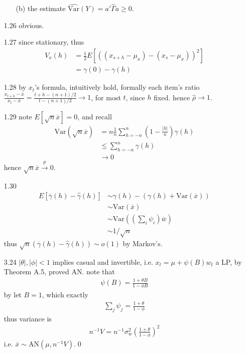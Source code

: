 \documentclass[paper=a4, fontsize=11pt]{scrartcl} %
\numberwithin{equation}{section} %
\numberwithin{figure}{section} %
\numberwithin{table}{section} %
\def \var {\text{Var}}
\begin{document}
\begin{itemize}
\begin{itemize}
		\item[(b)] the estimate $\widehat{\var}(Y)=a'\widehat{\Gamma}a\geq 0$.
	\end{itemize}
	\item[1.26] obvious.
	\item[1.27] since stationary, thus
	\begin{align}
		V_x(h) &= \frac{1}{2} E[((x_{s+h}-\mu_x)- (x_s-\mu_x))^2]\\
			&= \gamma(0) - \gamma(h)
	\end{align}
	\item[1.28] by $x_t$'s formula, intuitively hold, formally each item's ratio $\frac{x_{t+h}-\overline{x}}{x_t-\overline{x}}=\frac{t+h-(n+1)/2}{t-(n+1)/2}\rightarrow 1$, for most $t$, since $h$ fixed. hence $\widehat{\rho}\rightarrow 1$.
	\item[1.29] note $E[\sqrt{n}\overline{x}]=0$, and recall
	\begin{align}
		\var(\sqrt{n} \overline{x}) &= n\frac{1}{n}\sum_{h=-n}^n(1-\frac{|h|}{n})\gamma(h)\\
			&\leq \sum_{h=-n}^n\gamma(h)\\
			&\rightarrow 0
	\end{align}
	hence $\sqrt{n}\overline{x}\stackrel{p}{\rightarrow}0$.
	\item[1.30]
	\begin{align}
		E[\overline{\gamma}(h)- \widehat{\gamma}(h)] &\sim \gamma(h)-(\gamma(h)+\var(\overline{x}))\\
			&\sim \var(\overline{x})\\
			&\sim \var((\sum_i \psi_i)\overline{w})\\
			&\sim 1/\sqrt{n}
	\end{align}
	thus $\sqrt{n}(\overline{\gamma}(h)- \widehat{\gamma}(h)) \sim o(1)$ by Markov's.
	\item[3.24] $|\theta|,|\phi|<1$ implies casual and invertible, i.e. $x_t = \mu+ \psi(B)w_t$ a LP, by Theorem A.5, proved AN. note that
	\begin{align}
		\psi(B) = \frac{1 + \theta B}{1- \phi B}
	\end{align}
	by let $B=1$, which exactly
	\begin{align}
		\sum_j \psi_j = \frac{1 + \theta}{1-\phi}
	\end{align}
	thus variance is
	\begin{align}
		n^{-1}V = n^{-1}\sigma_w^2 \left(\frac{1 + \theta}{1-\phi}\right)^2
	\end{align}
	i.e. $\overline{x}\sim \text{AN}(\mu, n^{-1}V)$.\qed\\

\end{itemize}
\end{document}
